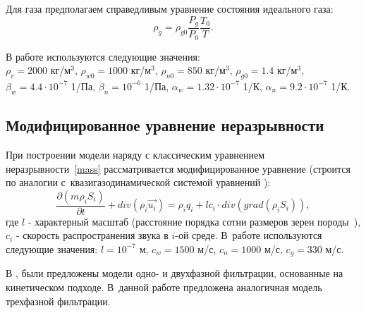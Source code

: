 Для газа предполагаем справедливым уравнение состояния идеального
газа:
$${\rho}_g = {\rho}_{g0}{\frac{P_g}{P_0}}{\frac{T_0}{T}}.$$

В работе используются следующие значения:\\
$\rho_r=2000$ кг/м$^3$, $\rho_{w0}=1000$ кг/м$^3$,
$\rho_{n0}=850$ кг/м$^3$, $\rho_{g0}=1.4$ кг/м$^3$,\\
$\beta_w=4.4\cdot10^{-7}$ 1/Па, $\beta_n=10^{-6}$ 1/Па,
$\alpha_w=1.32\cdot10^{-7}$ 1/К, $\alpha_n=9.2\cdot10^{-7}$ 1/К.

\subsection{Модифицированное уравнение неразрывности}
При построении модели наряду с классическим уравнением неразрывности~\ref{mass}
рассматривается модифицированное уравнение (строится по аналогии с~квазигазодинамической системой
уравнений \cite{Chetverushkin-Mathmod}):
\begin{equation}
 \label{mass_mod}
  \frac{\partial (m \rho_i S_i)}{\partial t}+ div(\rho_i \overrightarrow{u_i}) = \rho_i q_i + l c_i \cdot div(grad(\rho_i S_i)),
\end{equation}
где $l$ - характерный масштаб (расстояние порядка сотни размеров зерен породы~\cite{Chetverushkin}),
$c_i$ - скорость распространения звука в $i$-ой среде.
В~работе используются следующие значения: $l=10^{-7}$ м, $c_w=1500$ м/с, $c_n=1000$ м/с, $c_g=330$ м/с.

В \cite{Mathmod-2010},\cite{Mathmod-2011} были предложены модели одно- и двухфазной фильтрации, основанные на~
кинетическом подходе. В~данной работе предложена аналогичная модель трехфазной фильтрации.

